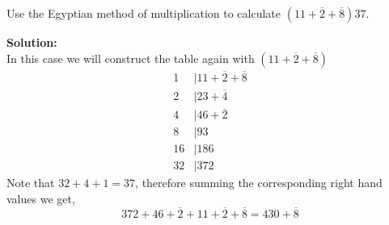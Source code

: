 \documentclass[12pt]{article}
\makeatletter
\theoremstyle{homework}
\newenvironment{exercise}[1]
{\def\@currentlabel{#1}\exercisecore}
{\endexercisecore}
\newcommand{\localhead}[1]{\par\smallskip\noindent\textbf{#1}\nobreak\\}%
\newcommand\solution{\localhead{Solution:}}
\makeatother
\begin{document}
    \begin{exercise}{3} Use the Egyptian method of multiplication to calculate $(11 + \overline{2} + \overline{8})37$.
        \solution In this case we will construct the table again with $(11 + \overline{2} + \overline{8})$
        \begin{align*}
            1 &| 11 + \overline{2} + \overline{8}\\ 
            2 &| 23 + \overline{4}\\ 
            4 &| 46 + \overline{2}\\ 
            8 &| 93\\
            16 &| 186 \\
            32 &| 372
        \end{align*}
        Note that $32 + 4 + 1 = 37$, therefore summing the corresponding right hand values we get, 
        \begin{equation*}
            372 + 46 + \overline{2} + 11 + \overline{2} + \overline{8} = 430 + \overline{8}
        \end{equation*}
    \end{exercise}
    
\end{document}
